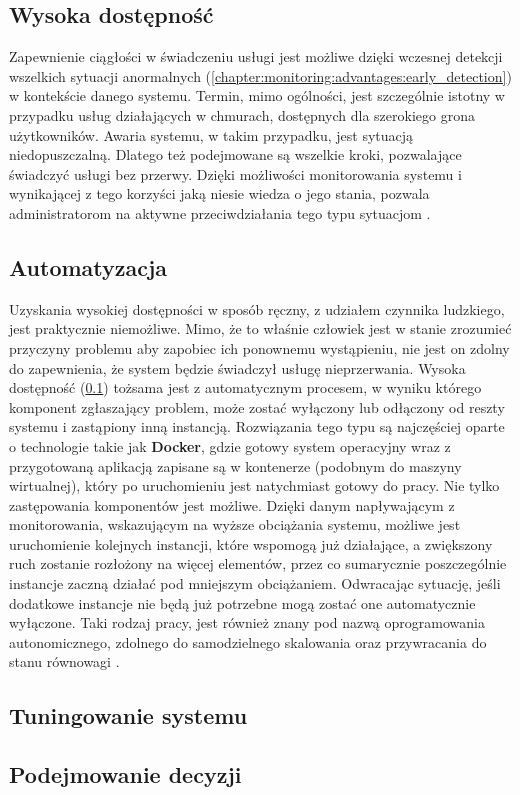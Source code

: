     \subsection{Wysoka dostępność}
    \label{chapter:monitoring:advantages:high_availability}
    Zapewnienie ciągłości w świadczeniu usługi jest możliwe dzięki wczesnej detekcji
    wszelkich sytuacji anormalnych (\ref{chapter:monitoring:advantages:early_detection}) w kontekście danego systemu. 
    Termin, mimo ogólności, jest szczególnie istotny w przypadku usług działających w chmurach, dostępnych
    dla szerokiego grona użytkowników. Awaria systemu, w takim przypadku, jest sytuacją niedopuszczalną. Dlatego
    też podejmowane są wszelkie kroki, pozwalające świadczyć usługi bez przerwy. Dzięki możliwości
    monitorowania systemu i wynikającej z tego korzyści jaką niesie wiedza o jego stania, pozwala
    administratorom na aktywne przeciwdziałania tego typu sytuacjom \cite{monitoring_and_alerting}. 
    
    \subsection{Automatyzacja}
    Uzyskania wysokiej dostępności w sposób ręczny, z udziałem czynnika ludzkiego, jest praktycznie niemożliwe.
    Mimo, że to właśnie człowiek jest w stanie zrozumieć przyczyny problemu aby zapobiec ich ponownemu wystąpieniu, 
    nie jest on zdolny do zapewnienia, że system będzie świadczył usługę nieprzerwania. Wysoka dostępność (\ref{chapter:monitoring:advantages:high_availability}) tożsama jest z automatycznym procesem, w wyniku którego
    komponent zgłaszający problem, może zostać wyłączony lub odłączony od reszty systemu i zastąpiony inną instancją.
    Rozwiązania tego typu są najczęściej oparte o technologie takie jak \textbf{Docker}, gdzie gotowy system
    operacyjny wraz z przygotowaną aplikacją zapisane są w kontenerze (podobnym do maszyny wirtualnej), który po 
    uruchomieniu jest natychmiast gotowy do pracy. Nie tylko zastępowania komponentów jest możliwe. Dzięki
    danym napływającym z monitorowania, wskazującym na wyższe obciążania systemu, możliwe jest uruchomienie
    kolejnych instancji, które wspomogą już działające, a zwiększony ruch zostanie rozłożony na więcej elementów,
    przez co sumarycznie poszczególnie instancje zaczną działać pod mniejszym obciążaniem. Odwracając sytuację, jeśli
    dodatkowe instancje nie będą już potrzebne mogą zostać one automatycznie wyłączone. Taki rodzaj pracy, jest również
    znany pod nazwą oprogramowania autonomicznego, zdolnego do samodzielnego skalowania oraz przywracania do stanu równowagi 
    \cite{monitoring_and_alerting}. 
    
    
    \subsection{Tuningowanie systemu}
    \subsection{Podejmowanie decyzji}